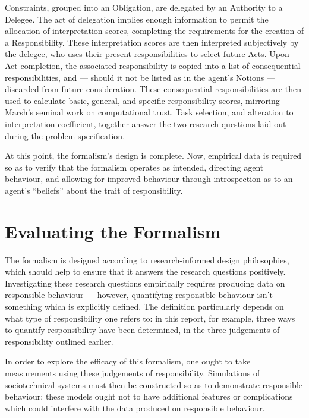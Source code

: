 Constraints, grouped into an Obligation, are delegated by an Authority to a Delegee. The act of delegation implies enough information to permit the allocation of interpretation scores, completing the requirements for the creation of a Responsibility. These interpretation scores are then interpreted subjectively by the delegee, who uses their present responsibilities to select future Acts. Upon Act completion, the associated responsibility is copied into a list of consequential responsibilities, and --- should it not be listed as in the agent's Notions --- discarded from future consideration. These consequential responsibilities are then used to calculate basic, general, and specific responsibility scores, mirroring Marsh's seminal work on computational trust. Task selection, and alteration to interpretation coefficient, together answer the two research questions laid out during the problem specification.\par

At this point, the formalism's design is complete. Now, empirical data is required so as to verify that the formalism operates as intended, directing agent behaviour, and allowing for improved behaviour through introspection as to an agent's ``beliefs'' about the trait of responsibility.\par

\section{Evaluating the Formalism}\label{sec:evaluation}
The formalism is designed according to research-informed design philosophies, which should help to ensure that it answers the research questions positively. Investigating these research questions empirically requires producing data on responsible behaviour --- however, quantifying responsible behaviour isn't something which is explicitly defined. The definition particularly depends on what type of responsibility one refers to: in this report, for example, three ways to quantify responsibility have been determined, in the three judgements of responsibility outlined earlier.\par

In order to explore the efficacy of this formalism, one ought to take measurements using these judgements of responsibility. Simulations of sociotechnical systems must then be constructed so as to demonstrate responsible behaviour; these models ought not to have additional features or complications which could interfere with the data produced on responsible behaviour.\par

